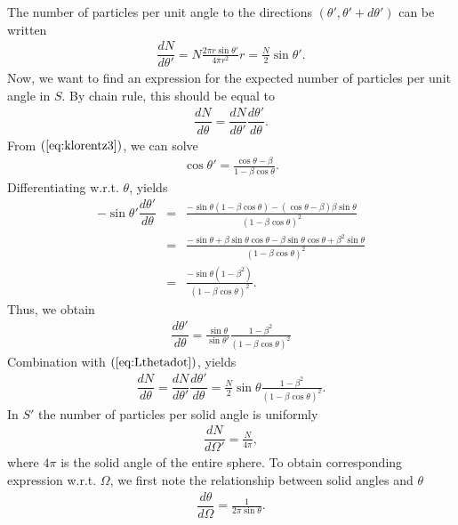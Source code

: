 \documentclass [12pt, a4paper] {article}
\newcommand{\diff}[2]
{
	\dfrac{d #1}{d #2}
}
\begin{document}
The number of particles per unit angle to the directions 
$(\theta', \theta' + d\theta')$ can be written
\begin {eqnarray}
    \label{eq:Lthetadot}
    \diff{N}{\theta'} 
    = 
    N \frac{2\pi r\sin\theta'}{4\pi r^2} r
    = 
    \frac{N}{2}\sin\theta'.
\end {eqnarray}
Now, we want to find an expression for the expected number of particles per unit 
angle in $S$. 
By chain rule, this should be equal to 
\begin {eqnarray}
    \diff{N}{\theta} = \diff{N}{\theta'}\diff{\theta'}{\theta}.
\end {eqnarray}
From $(\ref{eq:klorentz3})$, we can solve 
\begin {eqnarray}
    \cos\theta' = \frac{\cos\theta - \beta}{1 - \beta\cos\theta}.
\end {eqnarray}
Differentiating w.r.t. $\theta$, yields 
\begin {eqnarray}
    -\sin\theta'
    \diff{\theta'}{\theta}
    &=&
    \frac{-\sin\theta(1 - \beta\cos\theta) - (\cos\theta - \beta)\beta\sin\theta}
    {(1 - \beta\cos\theta)^2}
    \\
    &=&
    \frac{-\sin\theta + \beta\sin\theta\cos\theta - \beta\sin\theta\cos\theta + \beta^2\sin\theta}
    {(1 - \beta\cos\theta)^2}
    \\
    &=& 
    \frac{-\sin\theta(1 - \beta^2)}
    {(1 - \beta\cos\theta)^2}.
\end {eqnarray}
Thus, we obtain 
\begin {eqnarray}
    \diff{\theta'}{\theta}
    =
    \frac{\sin\theta}{\sin\theta'}\frac{1 - \beta^2}{(1 - \beta\cos\theta)^2}
\end {eqnarray}
Combination with $(\ref{eq:Lthetadot})$, yields
\begin {eqnarray}
    \diff{N}{\theta}
    =
    \diff{N}{\theta'}\diff{\theta'}{\theta}
    =
    \frac{N}{2}\sin\theta\frac{1 - \beta^2}{(1 - \beta\cos\theta)^2}.
\end {eqnarray}
In $S'$ the number of particles per solid angle is uniformly
\begin {eqnarray}
    \diff{N}{\Omega'} = \frac{N}{4\pi},
\end {eqnarray}
where $4\pi$ is the solid angle of the entire sphere.
To obtain corresponding expression w.r.t. $\Omega$, we first note the relationship
between solid angles and $\theta$
\begin {eqnarray}
    \diff{\theta}{\Omega} = \frac{1}{2\pi\sin\theta}.
\end {eqnarray}
\end{document}
